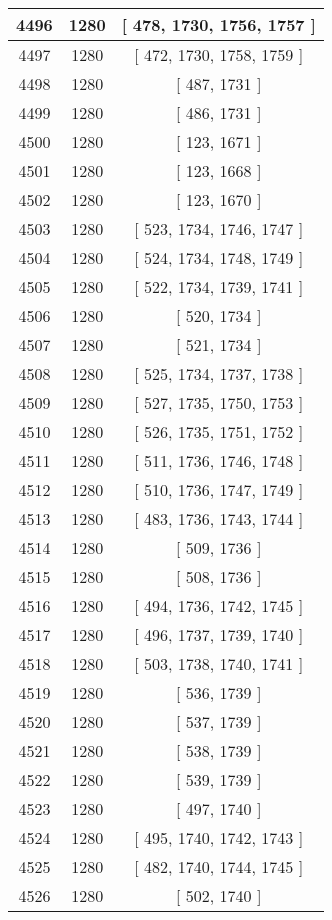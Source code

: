 \begin{center}
\begin{longtable}[H]{|| c c c ||}
\hline
4496 & 1280 & [ 478, 1730, 1756, 1757 ] \\ 
\hline
4497 & 1280 & [ 472, 1730, 1758, 1759 ] \\ 
\hline
4498 & 1280 & [ 487, 1731 ] \\ 
\hline
4499 & 1280 & [ 486, 1731 ] \\ 
\hline
4500 & 1280 & [ 123, 1671 ] \\ 
\hline
4501 & 1280 & [ 123, 1668 ] \\ 
\hline
4502 & 1280 & [ 123, 1670 ] \\ 
\hline
4503 & 1280 & [ 523, 1734, 1746, 1747 ] \\ 
\hline
4504 & 1280 & [ 524, 1734, 1748, 1749 ] \\ 
\hline
4505 & 1280 & [ 522, 1734, 1739, 1741 ] \\ 
\hline
4506 & 1280 & [ 520, 1734 ] \\ 
\hline
4507 & 1280 & [ 521, 1734 ] \\ 
\hline
4508 & 1280 & [ 525, 1734, 1737, 1738 ] \\ 
\hline
4509 & 1280 & [ 527, 1735, 1750, 1753 ] \\ 
\hline
4510 & 1280 & [ 526, 1735, 1751, 1752 ] \\ 
\hline
4511 & 1280 & [ 511, 1736, 1746, 1748 ] \\ 
\hline
4512 & 1280 & [ 510, 1736, 1747, 1749 ] \\ 
\hline
4513 & 1280 & [ 483, 1736, 1743, 1744 ] \\ 
\hline
4514 & 1280 & [ 509, 1736 ] \\ 
\hline
4515 & 1280 & [ 508, 1736 ] \\ 
\hline
4516 & 1280 & [ 494, 1736, 1742, 1745 ] \\ 
\hline
4517 & 1280 & [ 496, 1737, 1739, 1740 ] \\ 
\hline
4518 & 1280 & [ 503, 1738, 1740, 1741 ] \\ 
\hline
4519 & 1280 & [ 536, 1739 ] \\ 
\hline
4520 & 1280 & [ 537, 1739 ] \\ 
\hline
4521 & 1280 & [ 538, 1739 ] \\ 
\hline
4522 & 1280 & [ 539, 1739 ] \\ 
\hline
4523 & 1280 & [ 497, 1740 ] \\ 
\hline
4524 & 1280 & [ 495, 1740, 1742, 1743 ] \\ 
\hline
4525 & 1280 & [ 482, 1740, 1744, 1745 ] \\ 
\hline
4526 & 1280 & [ 502, 1740 ] \\ 

\end{longtable}
\end{center}
